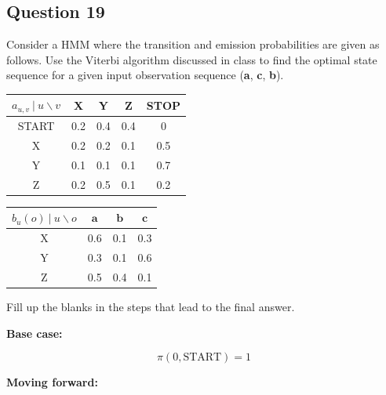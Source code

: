 \documentclass[11pt,fancychapters]{article}
\begin{document}
\subsection*{Question 19 {\normalfont{[13 points]}}}

Consider a HMM where the transition and emission probabilities are given as follows. Use the Viterbi algorithm discussed in class to find the optimal state sequence for a given input observation sequence (\textbf{a}, \textbf{c}, \textbf{b}).

\begin{table}[h!]
	\centering
	\begin{tabular}{| c | c | c | c | c |}
		\hline
		$a_{u, v} ~ | ~ u \backslash v$ & X & Y & Z & STOP \\
		\hline
		START & 0.2 & 0.4 & 0.4 & 0 \\
		\hline
		X & 0.2 & 0.2 & 0.1 & 0.5 \\
		\hline
		Y & 0.1 & 0.1 & 0.1 & 0.7 \\
		\hline
		Z & 0.2 & 0.5 & 0.1 & 0.2 \\ 
		\hline
	\end{tabular}
\end{table}

\begin{table}[h!]
	\centering
	\begin{tabular}{| c | c | c | c |}
		\hline
		$b_u(o) ~ | ~ u \backslash o$ & $\textbf{a}$ & $\textbf{b}$ & $\textbf{c}$ \\
		\hline
		X & 0.6 & 0.1 & 0.3 \\
		\hline
		Y & 0.3 & 0.1 & 0.6 \\
		\hline
		Z & 0.5 & 0.4 & 0.1 \\
		\hline
	\end{tabular}
\end{table}

Fill up the blanks in the steps that lead to the final answer.

\textbf{Base case:}

\begin{equation*}
	\pi(0, \text{START}) = 1
\end{equation*}

\textbf{Moving forward:}
\end{document}
